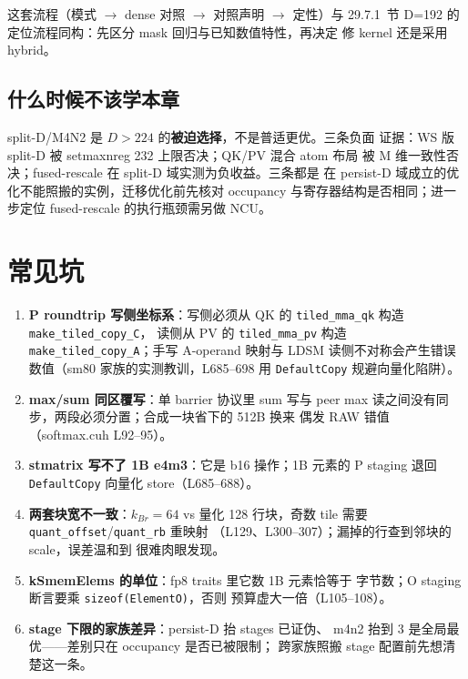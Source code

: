 这套流程（模式 $\to$ dense 对照 $\to$ 对照声明 $\to$ 定性）与
29.7.1~节 D=192 的定位流程同构：先区分 mask 回归与已知数值特性，再决定
修 kernel 还是采用 hybrid。

\subsection{什么时候不该学本章}

split-D/M4N2 是 $D>224$ 的\textbf{被迫选择}，不是普适更优。三条负面
证据：WS 版 split-D 被 setmaxnreg 232 上限否决；QK/PV 混合 atom 布局
被 M 维一致性否决；fused-rescale 在 split-D 域实测为负收益。三条都是
在 persist-D 域成立的优化不能照搬的实例，迁移优化前先核对 occupancy
与寄存器结构是否相同；进一步定位 fused-rescale 的执行瓶颈需另做 NCU。

\section{常见坑}

\begin{enumerate}[itemsep=2pt,topsep=2pt]
  \item \textbf{P roundtrip 写侧坐标系}：写侧必须从 QK 的
        \texttt{tiled\_mma\_qk} 构造 \texttt{make\_tiled\_copy\_C}，
        读侧从 PV 的 \texttt{tiled\_mma\_pv} 构造
        \texttt{make\_tiled\_copy\_A}；手写 A-operand 映射与 LDSM
        读侧不对称会产生错误数值（sm80 家族的实测教训，L685--698 用
        \texttt{DefaultCopy} 规避向量化陷阱）。
  \item \textbf{max/sum 同区覆写}：单 barrier 协议里 sum 写与 peer
        max 读之间没有同步，两段必须分置；合成一块省下的 512B 换来
        偶发 RAW 错值（softmax.cuh L92--95）。
  \item \textbf{stmatrix 写不了 1B e4m3}：它是 b16 操作；1B 元素的
        P staging 退回 \texttt{DefaultCopy} 向量化 store（L685--688）。
  \item \textbf{两套块宽不一致}：$k_{Br}=64$ vs 量化 128 行块，奇数
        tile 需要 \texttt{quant\_offset}/\texttt{quant\_rb} 重映射
        （L129、L300--307）；漏掉的行查到邻块的 scale，误差温和到
        很难肉眼发现。
  \item \textbf{kSmemElems 的单位}：fp8 traits 里它数 1B 元素恰等于
        字节数；O staging 断言要乘 \texttt{sizeof(ElementO)}，否则
        预算虚大一倍（L105--108）。
  \item \textbf{stage 下限的家族差异}：persist-D 抬 stages 已证伪、
        m4n2 抬到 3 是全局最优——差别只在 occupancy 是否已被限制；
        跨家族照搬 stage 配置前先想清楚这一条。
\end{enumerate}

